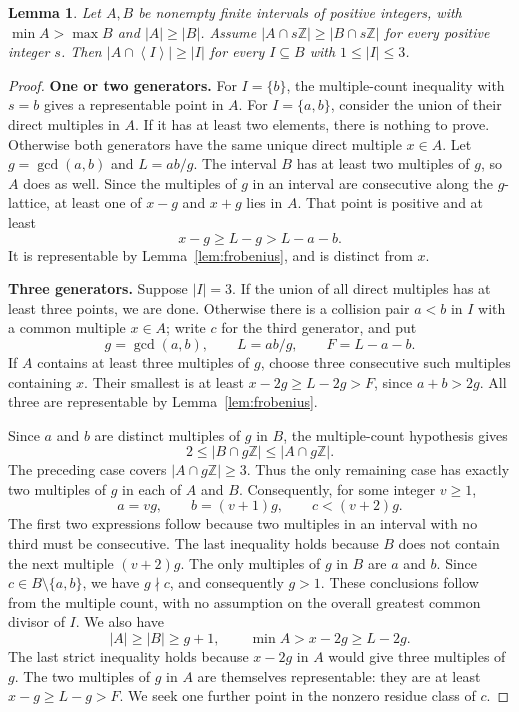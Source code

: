 \documentclass[11pt,a4paper]{article}
\numberwithin{equation}{section}
\newtheorem{lemma}[theorem]{Lemma}
\theoremstyle{remark}
\newcommand{\Z}{\mathbb Z}
\newcommand{\sg}[1]{\left\langle #1\right\rangle}
\begin{document}
\begin{lemma}\label{lem:three}
Let $A,B$ be nonempty finite intervals of positive integers, with
$\min A>\max B$ and $|A|\ge|B|$.
Assume $|A\cap s\Z|\ge|B\cap s\Z|$ for every positive integer $s$.
Then $|A\cap\sg{I}|\ge|I|$ for every $I\subseteq B$ with
$1\le|I|\le3$.
\end{lemma}

\begin{proof}
\textbf{One or two generators.}
For $I=\{b\}$, the multiple-count inequality with $s=b$ gives a
representable point in $A$.
For $I=\{a,b\}$, consider the union of their direct multiples in $A$.
If it has at least two elements, there is nothing to prove.
Otherwise both generators have the same unique direct multiple $x\in A$.
Let $g=\gcd(a,b)$ and $L=ab/g$.
The interval $B$ has at least two multiples of $g$, so $A$ does as well.
Since the multiples of $g$ in an interval are consecutive along the
$g$-lattice, at least one of $x-g$ and $x+g$ lies in $A$.
That point is positive and at least
\[
  x-g\ge L-g>L-a-b.
\]
It is representable by Lemma~\ref{lem:frobenius}, and is distinct
from $x$.

\textbf{Three generators.}
Suppose $|I|=3$.
If the union of all direct multiples has at least three points,
we are done. Otherwise there is a collision pair $a<b$ in $I$ with
a common multiple $x\in A$; write $c$ for the third generator, and put
\[
  g=\gcd(a,b),\qquad L=ab/g,\qquad F=L-a-b.
\]
If $A$ contains at least three multiples of $g$, choose three
consecutive such multiples containing $x$.
Their smallest is at least $x-2g\ge L-2g>F$, since $a+b>2g$.
All three are representable by Lemma~\ref{lem:frobenius}.

Since $a$ and $b$ are distinct multiples of $g$ in $B$, the
multiple-count hypothesis gives
\[
  2\le |B\cap g\Z|\le |A\cap g\Z|.
\]
The preceding case covers $|A\cap g\Z|\ge3$. Thus the only remaining
case has exactly two multiples of $g$ in each of $A$ and $B$.
Consequently, for some integer $v\ge1$,
\begin{equation}\label{eq:threeconsecutive}
  a=vg,\qquad b=(v+1)g,\qquad c<(v+2)g.
\end{equation}
The first two expressions follow because two multiples in an interval
with no third must be consecutive. The last inequality holds because
$B$ does not contain the next multiple $(v+2)g$.
The only multiples of $g$ in $B$ are $a$ and $b$.
Since $c\in B\setminus\{a,b\}$, we have $g\nmid c$, and consequently
$g>1$. These conclusions follow from the multiple count, with no
assumption on the overall greatest common divisor of $I$.
We also have
\begin{equation}\label{eq:threelength}
  |A|\ge|B|\ge g+1,\qquad
  \min A>x-2g\ge L-2g.
\end{equation}
The last strict inequality holds because $x-2g$ in $A$ would give
three multiples of $g$.
The two multiples of $g$ in $A$ are themselves representable:
they are at least $x-g\ge L-g>F$.
We seek one further point in the nonzero residue class of $c$.


\end{proof}
\end{document}
